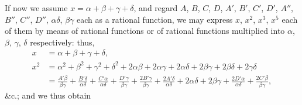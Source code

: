 \documentclass[11pt]{article}
\begin{document}
\hspace{1em} If now we assume $x=\alpha+\beta+\gamma+\delta$, and regard $A$,
$B$, $C$, $D$, $A'$, $B'$, $C'$, $D'$, $A''$, $B''$, $C''$, $D''$,
$\alpha\delta$, $\beta\gamma$ each as a rational function, we may express
$x$, $x^{2}$, $x^{3}$, $x^{5}$ each of them by means of rational functions or
of rational functions multiplied into $\alpha$, $\beta$, $\gamma$, $\delta$
respectively: thus,
\[
\begin{aligned}
x &= \alpha+\beta+\gamma+\delta,\\
x^{2} &= \alpha^{2}+\beta^{2}+\gamma^{2}+\delta^{2}
   +2\alpha\beta+2\alpha\gamma+2\alpha\delta+2\beta\gamma+2\beta\delta+2\gamma\delta\\
&= \frac{A'\beta}{\beta\gamma}+\frac{B'\delta}{\alpha\delta}+\frac{C'\alpha}{\alpha\delta}+\frac{D'\gamma}{\beta\gamma}
   +\frac{2B'\gamma}{\beta\gamma}+\frac{2A'\delta}{\alpha\delta}+2\alpha\delta+2\beta\gamma+\frac{2D'\alpha}{\alpha\delta}+\frac{2C'\beta}{\beta\gamma},
\end{aligned}
\]
\&c.; and we thus obtain
\end{document}
